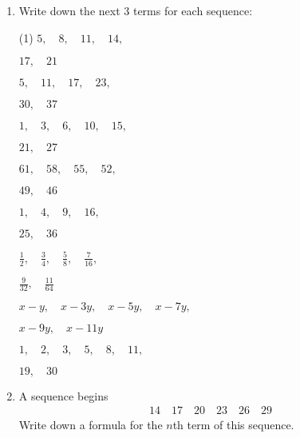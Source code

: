 \begin{enumerate} [leftmargin=0cm] 

\item Write down the next 3 terms for each sequence:
\begin{tasks}[label=(\alph*), after-item-skip=2pt,after-skip=3pt, label-width=4ex](1)
    \task  $ 5,  \quad 8,  \quad 11, \quad 14, \quad           $                                  \begin{envFillIn} $   17, \quad 21                         $ \end{envFillIn}
    \task  $ 5,  \quad 11,  \quad 17, \quad 23, \quad          $                                  \begin{envFillIn} $   30, \quad 37                         $ \end{envFillIn}
    \task  $ 1,  \quad 3,  \quad 6, \quad 10, \quad 15, \quad  $                                  \begin{envFillIn} $   21, \quad 27                         $ \end{envFillIn}
    \task  $ 61, \quad 58, \quad 55, \quad 52, \quad           $                                  \begin{envFillIn} $   49, \quad 46                         $ \end{envFillIn}
    \task  $ 1 , \quad 4,  \quad 9, \quad 16,  \quad           $                                  \begin{envFillIn} $   25, \quad 36                         $ \end{envFillIn}
    \task  $ \frac{1}{2} , \quad \frac{3}{4},  \quad \frac{5}{8}, \quad \frac{7}{16},  \quad   $  \begin{envFillIn} $   \frac{9}{32}, \quad \frac{11}{64}    $ \end{envFillIn}
    \task  $ x-y , \quad x-3y,  \quad x-5y, \quad x-7y,  \quad   $                                \begin{envFillIn} $   x-9y, \quad x-11y                    $ \end{envFillIn}
    \task  $ 1,  \quad 2,  \quad 3, \quad 5, \quad 8, \quad 11, \quad  $                          \begin{envFillIn} $   19, \quad 30                         $ \end{envFillIn}

\end{tasks}

\item A sequence begins
      \begin{align*}
           14  \quad 17   \quad  20  \quad  23  \quad  26  \quad  29
      \end{align*}       
    Write down a formula for the $n$th term of this sequence.       


\end{enumerate}
